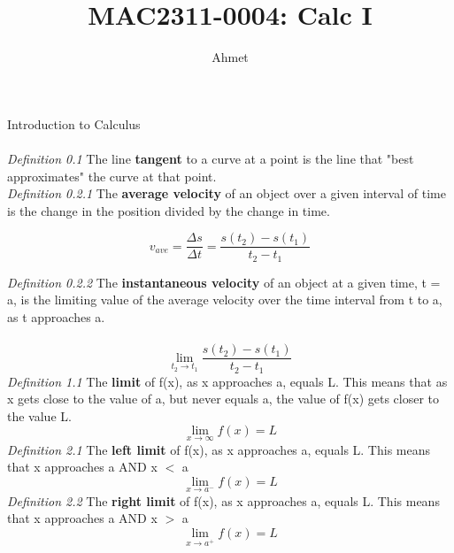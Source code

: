 \documentclass{book}
\title{MAC2311-0004: Calc I}
\author{Ahmet}
\begin{document}
\newcommand{\vasymptote}[2][]{
    \draw [densely dashed,#1] ({rel axis cs:0,0} -| {axis cs:#2,0}) -- ({rel axis cs:0,1} -| {axis cs:#2,0});
}


\noindent Introduction to Calculus\\\\
\emph{Definition 0.1} The line \textbf{tangent} to a curve at a point is the line that "best approximates" the curve at that point.\\

\noindent\emph{Definition 0.2.1} The \textbf{average velocity} of an object over a given interval of time is the change in the position divided by the change in time.
\begin{center}
$$v_{ave} = \frac{\Delta s}{\Delta t} = \frac{s(t_2) - s(t_1)}{t_2 - t_1}$$
\end{center}

\noindent\emph{Definition 0.2.2} The \textbf{instantaneous velocity} of an object at a given time, t = a, is the limiting value of the average velocity over the time interval from t to a, as t approaches a.\\\\
$$\lim_{t_2 \to t_1} \frac{s(t_2) - s(t_1)}{t_2 - t_1}$$
\newline\noindent\emph{Definition 1.1} The \textbf{limit} of f(x), as x approaches a, equals L. This means that as x gets close to the value of a, but never equals a, the value of f(x) gets closer to the value L.
$$\lim_{x \to \infty} f(x) = L$$
\newline\noindent\emph{Definition 2.1} The \textbf{left limit} of f(x), as x approaches a, equals L. This means that x approaches a AND \newline x $<$ a
$$\lim_{x \to a^-} f(x) = L$$
\newline\noindent\emph{Definition 2.2} The \textbf{right limit} of f(x), as x approaches a, equals L. This means that x approaches a AND \newline x $>$ a
$$\lim_{x \to a^+} f(x) = L$$
\end{document}
